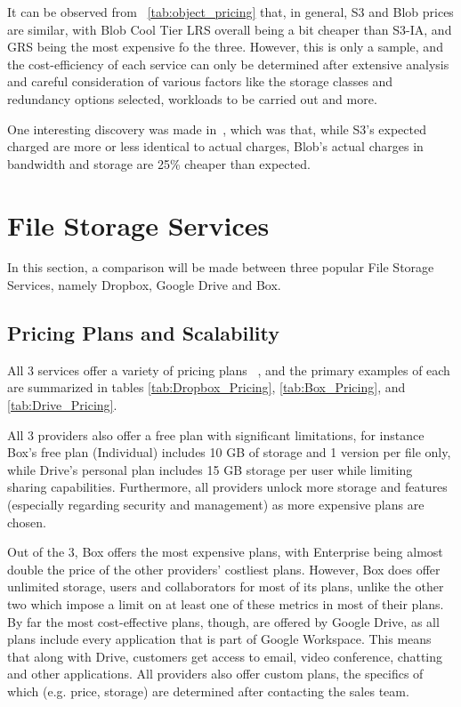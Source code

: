It can be observed from ~\ref{tab:object_pricing} that, in general, S3 and Blob prices are similar, with Blob Cool Tier LRS overall being a bit cheaper than S3-IA, and GRS being the most expensive fo the three. However, this is only a sample, and the cost-efficiency of each service can only be determined after extensive analysis and careful consideration of various factors like the storage classes and redundancy options selected, workloads to be carried out and more.

One interesting discovery was made in~\cite{s3vsblob_performance}, which was that, while S3's expected charged are more or less identical to actual charges, Blob's actual charges in bandwidth and storage are 25\% cheaper than expected.

\section{File Storage Services}
In this section, a comparison will be made between three popular File Storage Services, namely Dropbox, Google Drive and Box.

\subsection{Pricing Plans and Scalability}
All 3 services offer a variety of pricing plans ~\cite{dropbox,google_drive,box}, and the primary examples of each are summarized in tables  \ref{tab:Dropbox_Pricing}, \ref{tab:Box_Pricing}, and \ref{tab:Drive_Pricing}.

All 3 providers also offer a free plan with significant limitations, for instance Box's free plan (Individual) includes 10 GB of storage and 1 version per file only, while Drive's personal plan includes 15 GB storage per user while limiting sharing capabilities. Furthermore, all providers unlock more storage and features (especially regarding security and management) as more expensive plans are chosen.

Out of the 3, Box offers the most expensive plans, with Enterprise being almost double the price of the other providers' costliest plans. However, Box does offer unlimited storage, users and collaborators for most of its plans, unlike the other two which impose a limit on at least one of these metrics in most of their plans.  By far the most cost-effective plans, though, are offered by Google Drive, as all plans include every application that is part of Google Workspace. This means that along with Drive, customers get access to email, video conference, chatting and other applications. All providers also offer custom plans, the specifics of which (e.g. price, storage) are determined after contacting the sales team.

